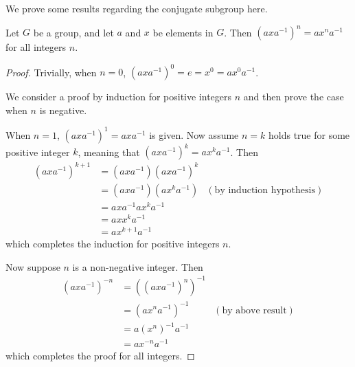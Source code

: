 We prove some results regarding the conjugate subgroup here.
\begin{proposition}\label{prop-power-of-conjugate-equals-conjugate-of-power}
    Let $G$ be a group, and let $a$ and $x$ be elements in $G$. Then $(axa^{-1})^n = ax^na^{-1}$ for all integers $n$.
\end{proposition}
\begin{proof}
    Trivially, when $n = 0$, $(axa^{-1})^0 = e = x^0 = ax^0a^{-1}$.
    
    We consider a proof by induction for positive integers $n$ and then prove the case when $n$ is negative.

    When $n = 1$, $(axa^{-1})^1 = axa^{-1}$ is given. Now assume $n = k$ holds true for some positive integer $k$, meaning that $(axa^{-1})^k = ax^ka^{-1}$. Then
    \begin{align*}
        (axa^{-1})^{k+1} &= (axa^{-1})(axa^{-1})^k\\
        &= (axa^{-1})(ax^ka^{-1}) & (\text{by induction hypothesis})\\
        &= axa^{-1}ax^ka^{-1}\\
        &= axx^ka^{-1}\\
        &= ax^{k+1}a^{-1}
    \end{align*}
    which completes the induction for positive integers $n$.

    Now suppose $n$ is a non-negative integer. Then
    \begin{align*}
        (axa^{-1})^{-n} &= ((axa^{-1})^n)^{-1}\\
        &= (ax^na^{-1})^{-1} & (\text{by above result})\\
        &= a(x^n)^{-1}a^{-1}\\
        &= ax^{-n}a^{-1}
    \end{align*}
    which completes the proof for all integers.
\end{proof}

